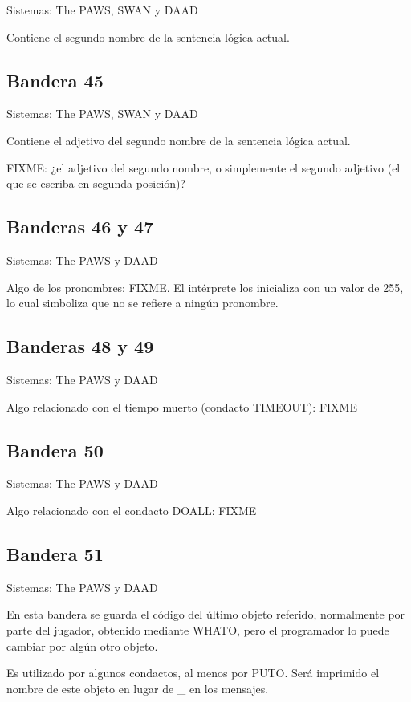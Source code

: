 \documentclass[11pt, a5paper]{article}
\newcommand{\paw}{\textsf{The PAWS}\xspace}
\newcommand{\swan}{\textsf{SWAN}\xspace}
\newcommand{\daad}{\textsf{DAAD}\xspace}
\newcommand{\sistemas}[1]{\noindent Sistemas: #1 \nopagebreak}
\begin{document}
\sistemas{\paw, \swan y \daad}

Contiene el segundo nombre de la sentencia lógica actual.

\subsection{Bandera 45}

\sistemas{\paw, \swan y \daad}

Contiene el adjetivo del segundo nombre de la sentencia lógica actual.

FIXME: ¿el adjetivo del segundo nombre, o simplemente el segundo adjetivo (el que se escriba en segunda posición)?

\subsection{Banderas 46 y 47}

\sistemas{\paw y \daad}

Algo de los pronombres: FIXME. El intérprete los inicializa con un valor de 255, lo cual simboliza que no se refiere a ningún pronombre.

\subsection{Banderas 48 y 49}

\sistemas{\paw y \daad}

Algo relacionado con el tiempo muerto (condacto TIMEOUT): FIXME

\subsection{Bandera 50}

\sistemas{\paw y \daad}

Algo relacionado con el condacto DOALL: FIXME

\subsection{Bandera 51}

\sistemas{\paw y \daad}

En esta bandera se guarda el código del último objeto referido, normalmente por parte del jugador, obtenido mediante WHATO, pero el programador lo puede cambiar por algún otro objeto.

Es utilizado por algunos condactos, al menos por PUTO. Será imprimido el nombre de este objeto en lugar de \_ en los mensajes.
\end{document}
